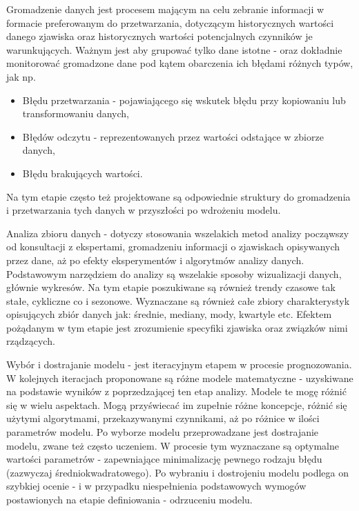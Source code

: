\documentclass[10pt,a4paper]{book}
\begin{document}
Gromadzenie danych jest procesem mającym na celu zebranie informacji w formacie preferowanym do przetwarzania, dotyczącym historycznych wartości danego zjawiska oraz historycznych wartości potencjalnych czynników je warunkujących. Ważnym jest aby grupować tylko dane istotne - oraz dokładnie monitorować gromadzone dane pod kątem obarczenia ich błędami różnych typów, jak np.
\begin{itemize}
\item Błędu przetwarzania - pojawiającego się wskutek błędu przy kopiowaniu lub transformowaniu danych,
\item Błędów odczytu - reprezentowanych przez wartości odstające w zbiorze danych, 
\item Błędu brakujących wartości. 
\end{itemize}
Na tym etapie często też projektowane są odpowiednie struktury do gromadzenia i przetwarzania tych danych w przyszłości po wdrożeniu modelu.

Analiza zbioru danych - dotyczy stosowania wszelakich metod analizy począwszy od konsultacji z ekspertami, gromadzeniu informacji o zjawiskach opisywanych przez dane, aż po efekty eksperymentów i algorytmów analizy danych. Podstawowym narzędziem do analizy są wszelakie sposoby wizualizacji danych, głównie wykresów. Na tym etapie poszukiwane są również trendy czasowe tak stałe, cykliczne co i sezonowe. Wyznaczane są również całe zbiory charakterystyk opisujących zbiór danych jak: średnie, mediany, mody, kwartyle etc. Efektem pożądanym w tym etapie jest zrozumienie specyfiki zjawiska oraz związków nimi rządzących.

Wybór i dostrajanie modelu  - jest iteracyjnym etapem w procesie prognozowania. W kolejnych iteracjach proponowane są różne modele matematyczne - uzyskiwane na podstawie wyników z poprzedzającej ten etap analizy. Modele te mogę różnić się w wielu aspektach. Mogą przyświecać im zupełnie różne koncepcje, różnić się użytymi algorytmami, przekazywanymi czynnikami, aż po różnice w ilości parametrów modelu. Po wyborze modelu przeprowadzane jest dostrajanie modelu, zwane też często uczeniem. W procesie tym wyznaczane są optymalne wartości parametrów - zapewniające minimalizację pewnego rodzaju błędu (zazwyczaj średniokwadratowego). Po wybraniu i dostrojeniu modelu podlega on szybkiej ocenie - i w przypadku niespełnienia podstawowych wymogów postawionych na etapie definiowania - odrzuceniu modelu.
\end{document}
